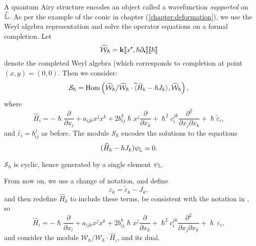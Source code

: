     A quantum Airy structure encodes an object called a wavefunction \emph{supported} on \(\widehat{\mathbb{L}} \). 
    As per the example of the conic in chapter (\ref{chapter:deformation}), we use the Weyl algebra representation and solve the operator equations on a formal completion. Let
    \[ \widehat{\mathcal{W}}_{\hslash} = \mathbf{k} \lBrack x^{\sbt}, \hslash \partial_{\sbt} \rBrack \lBrack \hslash \rBrack \] 
    denote the completed Weyl algebra (which corresponds to completion at point \((x,y)=(0,0)\). Then we consider:
    \[ \mathcal{S}_{\hslash} = \mathrm{Hom}\left( \widehat{\mathcal{W}}_{\hslash}/\widehat{\mathcal{W}}_{\hslash} \cdot \widehat \langle \widehat{H}_k - \hslash J_k \rangle , \widehat{\mathcal{W}}_{\hslash} \right), \]
    where 
    \[ \widehat{H}_i =  - \hslash \frac{\partial}{\partial x_i} + a_{ijk} x^j x^k + 2 b_{ij}^k \hslash x^j \frac{ \partial }{\partial x_k}+ \hslash^2 c_{i}^{jk} \frac{\partial^2}{\partial x_j \partial x_k} + \hslash \widetilde{\varepsilon}_i ,\]
    and \( \widehat{\varepsilon}_i = b_{ij}^j\) as before. The module \( \mathcal{S}_{\hslash}\) encodes the solutions to the equations \[ (\widehat{H}_k - \hslash J_k ) \psi_{\mathbb{L}} = 0.\]
    \begin{prop}
    \( \mathcal{S}_{\hslash} \) is cyclic, hence generated by a single element \( \psi_{\mathbb{L}} \).
    \end{prop}
    From now on, we use a change of notation, and define
    \[ \varepsilon_k = \widetilde{\varepsilon}_k - J_k,\]
    and then redefine \( \widehat{H}_k \) to include these terms, be consistent with the notation in \cite{ks_airy}, so 
    \[ \widehat{H}_i =  - \hslash \frac{\partial}{\partial x_i} + a_{ijk} x^j x^k + 2 b_{ij}^k \hslash x^j \frac{ \partial }{\partial x_k}+ \hslash^2 c_{i}^{jk} \frac{\partial^2}{\partial x_j \partial x_k} + \hslash \, \varepsilon_i, \] 
    and consider the module \( \mathcal{W}_{\hslash} / \mathcal{W}_{\hslash} \cdot \widehat{H}_i \), and its dual.
    
    

